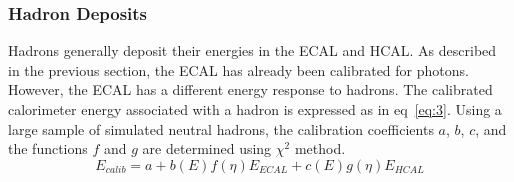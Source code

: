 


\subsubsection{Hadron Deposits}

Hadrons generally deposit their energies in the ECAL and HCAL.
As described in the previous section, the ECAL has already been calibrated for photons.
However, the ECAL has a different energy response to hadrons.
The calibrated calorimeter energy associated with a hadron is expressed as in eq~\ref{eq:3}.
Using a large sample of simulated neutral hadrons, the calibration coefficients $a$, $b$, $c$, and the functions $f$ and $g$ are determined using $\chi^{2}$ method.
\begin{equation}
E_{calib} = a + b(E)f(\eta)E_{ECAL} + c(E)g(\eta)E_{HCAL}
\label{eq:3}
\end{equation}
